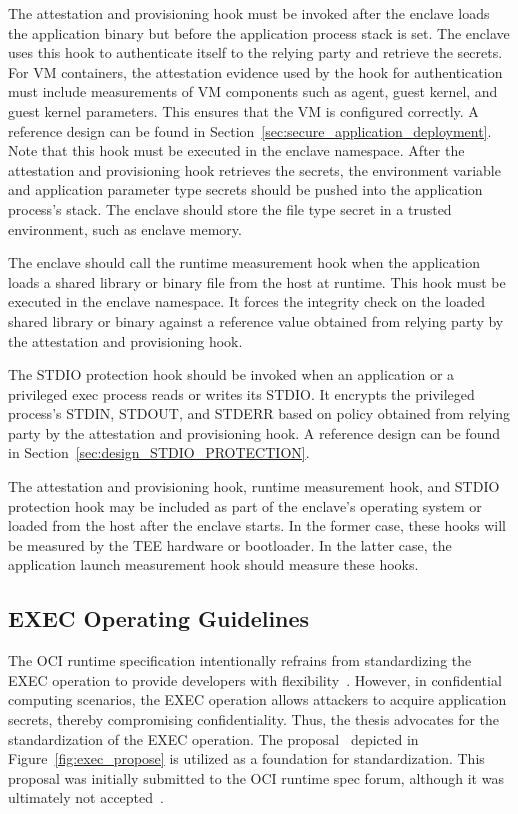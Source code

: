   The attestation and provisioning hook must be invoked after the enclave loads the application binary but before the application process stack is set. The enclave uses this hook to authenticate itself to the relying party and retrieve the secrets. For VM containers, the attestation evidence used by the hook for authentication must include measurements of 
  VM components such as agent, guest kernel, and guest kernel parameters. This ensures that the VM is configured correctly. A reference design can be found in Section~\ref{sec:secure_application_deployment}. Note that this hook must be 
  executed in the enclave namespace. After the attestation and provisioning hook retrieves the secrets, the environment variable and application parameter type secrets should be pushed into the application process's stack. The enclave should store the file type secret in a trusted environment, such as enclave memory. 
   
   
  The enclave should call the runtime measurement hook when the application loads a shared library or binary file from the host at runtime. This hook must be executed in the enclave namespace. It forces the integrity check on the loaded shared library or binary against a reference value obtained from relying party by the attestation and provisioning hook.    
   
   
  The STDIO protection hook should be invoked when an application or a privileged exec process reads or writes its STDIO. It encrypts the privileged process's STDIN, STDOUT, and STDERR based on policy obtained from relying party by the attestation and provisioning hook. A reference design can be found in Section~\ref{sec:design_STDIO_PROTECTION}.
   
  The attestation and provisioning hook, runtime measurement hook, and STDIO protection hook may be included as part of the enclave's operating system or loaded from the host after the enclave starts. In the former case, these hooks will be measured by the \acrshort{TEE} hardware or bootloader. In 
  the latter case, the application launch measurement hook should measure these hooks. 
\subsection{EXEC Operating Guidelines}
\label{subsec:oci_exec}
The OCI runtime specification intentionally refrains from standardizing the EXEC operation to provide developers with flexibility~\cite*{exec_semantics}. However, in confidential computing scenarios, the EXEC operation allows attackers to acquire application secrets, thereby compromising confidentiality. Thus, the thesis advocates for the 
standardization of the EXEC operation. The proposal~\cite*{exec_proposal} depicted in Figure~\ref{fig:exec_propose} is utilized as a foundation for standardization. This proposal was initially submitted to the OCI runtime spec forum, although it was ultimately not accepted~\cite*{exec_semantics}.
 
